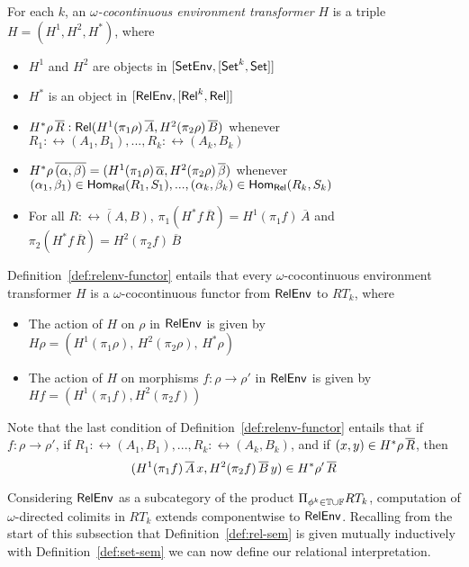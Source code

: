 \documentclass{lmcs}
\theoremstyle{plain}\newtheorem{satz}[thm]{Satz}
\newcommand{\set}{\mathsf{Set}}
\begin{document}
{\begin{defi}\label{def:relenv-functor}
  For each $k$, an {\em $\omega$-cocontinuous environment transformer}
  $H$ is a triple $H = (H^1,H^2,H^*)$, where
\begin{itemize}
\item $H^1$ and $H^2$ are objects in $[\setenv,[\set^k,\set]]$
\item $H^*$ is an object in $[\mathsf{RelEnv},[\mathsf{Rel}^k,\mathsf{Rel}]]$
\item $H^*\rho\, \overline{R} : \mathsf{Rel}(H^1(\pi_1 \rho)\, \overline{A}, H^2(\pi_2
  \rho)\, \overline{B})$ whenever $R_1 : \rel(A_1,B_1),...,R_k :
  \rel(A_k,B_k)$
\item $H^*\rho\, \overline{(\alpha, \beta)} = (H^1(\pi_1 \rho)\,\overline{\alpha},
  H^2(\pi_2 \rho)\, \overline{\beta})$ whenever $(\alpha_1, \beta_1) \in
  \mathsf{Hom_{Rel}}(R_1,S_1),..., (\alpha_k, \beta_k) \in \mathsf{Hom_{Rel}}(R_k,S_k)$
\item For all $\overline{R : \rel(A,B)}$, $\pi_1(H^*f
  \,{\overline{R}}) = H^1 (\pi_1 f)\,{\overline{A}}$ and $\pi_2(H^*f
  \,{\overline{R}}) = H^2 (\pi_2 f)\,{\overline{B}}$
\end{itemize}
\end{defi}
\noindent
Definition~\ref{def:relenv-functor} entails that every
$\omega$-cocontinuous environment transformer $H$ is a
$\omega$-cocontinuous functor from $\mathsf{RelEnv}$ to $RT_k$, where
\begin{itemize}
\item The action of $H$ on $\rho$ in $\mathsf{RelEnv}$ is given by $H \rho = (H^1
  (\pi_1 \rho),\,H^2 (\pi_2 \rho),\,H^*\rho)$
\item The action of $H$ on morphisms $f : \rho \to \rho'$ in $\mathsf{RelEnv}$
  is given by $Hf = (H^1 (\pi_1 f),H^2 (\pi_2 f))$
\end{itemize}
\noindent
Note that the last condition of Definition~\ref{def:relenv-functor}
entails that if $f : \rho \to \rho'$, if
$R_1:\rel(A_1,B_1),...,R_k:\rel(A_k,B_k)$, and if $(x, y) \in
H^*\rho\,\overline{R}$, then \[(H^1(\pi_1 f)\,{\overline{A}}\,x, H^2(\pi_2
f)\,{\overline{B}}\,y) \in H^*\rho'\,\overline{R}\]

Considering $\mathsf{RelEnv}$ as a subcategory of the product $\Pi_{\phi^k \in
  \mathbb{T} \cup \mathbb{F}} RT_k$, computation of $\omega$-directed colimits
in $RT_k$ extends componentwise to $\mathsf{RelEnv}$. Recalling from the start
of this subsection that Definition~\ref{def:rel-sem} is given mutually
inductively with Definition~\ref{def:set-sem} we can now define our
relational interpretation.

}
\end{document}
